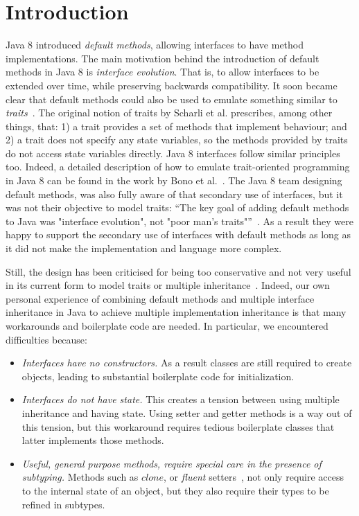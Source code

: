 \section{Introduction}\label{sec:intro}

Java 8 introduced \emph{default methods}, allowing interfaces to have
method implementations. The main motivation behind the introduction of
default methods in Java 8 is \emph{interface evolution}. That is, to
allow interfaces to be extended over time, while preserving backwards
compatibility. It soon became clear that default methods could also be
used to emulate something similar to \emph{traits}~\cite{}. The
original notion of traits by Scharli et al. prescribes, among other
things, that: 1) a trait provides a set of methods that implement
behaviour; and 2) a trait does not specify any state variables, so the
methods provided by traits do not access state variables
directly. Java 8 interfaces follow similar principles too. Indeed, a
detailed description of how to emulate trait-oriented programming in
Java 8 can be found in the work by Bono et al.~\cite{}.  The Java 8
team designing default methods, was also fully aware of that secondary
use of interfaces, but it was not their objective to model traits:
``The key goal of adding default methods to Java was "interface
evolution", not "poor man's traits"''~\cite{mailing list}. As a result
they were happy to support the secondary use of interfaces with
default methods as long as it did not make the implementation and
language more complex.
 
Still, the design has been criticised for being too conservative and 
not very useful in its current form to model traits or multiple 
inheritance~\cite{}. 
Indeed, our own personal experience of combining default methods 
and multiple interface inheritance in Java to achieve multiple implementation 
inheritance is that many workarounds and boilerplate code are needed. 
In particular, we encountered difficulties because:

\begin{itemize}

\item {\em Interfaces have no constructors.} As a result classes are 
still required to create objects, leading to substantial boilerplate 
code for initialization.

\item {\em Interfaces do not have state.} This creates a tension between 
 using multiple inheritance and having state. Using setter and
  getter methods is a way out of this tension, but this workaround
  requires tedious boilerplate classes that latter implements those
  methods.

\item {\em Useful, general purpose methods, require special care in
  the presence of subtyping.} Methods such as $clone$, or
  \emph{fluent} setters~\cite{}, not only require access to the
  internal state of an object, but they also require their types to be
  refined in subtypes.

\end{itemize}

